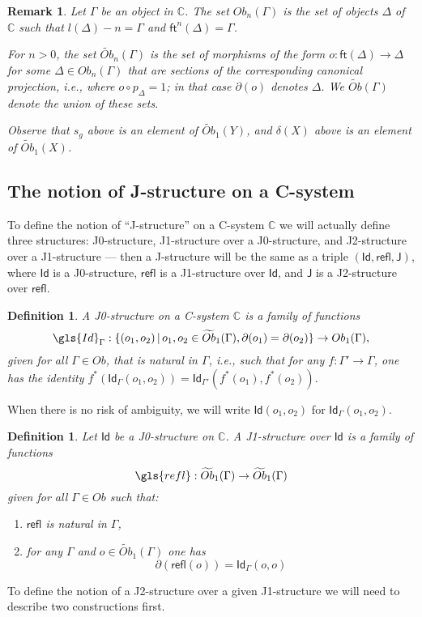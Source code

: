 \documentclass[12pt]{article}
\numberwithin{equation}{section}
\newenvironment{eq}{\begin{equation}}{\end{equation}}
\newtheorem{definition}[proposition]{Definition}
\newtheorem{remark}[proposition]{Remark}
\newcommand{\llabel}[1]{\label{#1}}
\newcommand{\sr}{\rightarrow}
\newcommand{\wt}{\widetilde}
\newcommand{\CC}{{\mathbb C}}  %
\newcommand{\id}{1}            %
\newcommand{\ft}{\mathsf{ft}}
\newcommand{\Id}{\mathsf{Id}} %
\newcommand{\refl}{\mathsf{refl}}
\newcommand{\J}{\mathsf{J}}
\newcommand{\Ob}{Ob}
\newcommand{\Obwt}{\wt{Ob}}
\begin{document}
\begin{remark}
  Let $\Gamma$ be an object in $\CC$.  The set $\Ob_n(\Gamma)$ is the set of
  objects $\Delta$ of $\CC$ such that $l(\Delta)-n = \Gamma$ and
  $\ft^n(\Delta) = \Gamma$.

  For $n>0$, the set $\Obwt_n(\Gamma)$ is the set of morphisms of the form $o :
  \ft(\Delta) \sr \Delta$ for some $\Delta \in \Ob_n(\Gamma)$ that are sections
  of the corresponding canonical projection, i.e., where $o \circ p_\Delta = \id$;
  in that case $\partial(o)$ denotes $\Delta$.  We $\Obwt(\Gamma)$ denote the
  union of these sets.

  Observe that $s_g$ above is an element of $\Obwt_1(Y)$, and $\delta(X)$ above
  is an element of $\Obwt_1(X)$.
\end{remark}

\subsection{The notion of J-structure on a C-system}
%


To define the notion of ``J-structure'' on a C-system $\CC$ we will actually define three
structures: J0-structure, J1-structure over a J0-structure, and J2-structure
over a J1-structure --- then a J-structure will be the same as a triple
$(\Id,\refl,\J)$, where $\Id$ is a J0-structure, $\refl$ is a J1-structure over
$\Id$, and $\J$ is a J2-structure over $\refl$.

\begin{definition}
\llabel{2015.03.27.def1}
A J0-structure on a C-system $\CC$ is a family of functions 
%
$$\gls{Id}_{\Gamma}:\{(o_1,o_2)\,|\,o_1, o_2 \in \Obwt_1(\Gamma), \partial(o_1)=\partial(o_2)\}\sr Ob_1(\Gamma),$$
%
given for all $\Gamma\in Ob$, that is natural in $\Gamma$, i.e., such that for any
$f:\Gamma'\sr \Gamma$, one has the identity
$f^*(\Id_{\Gamma}(o_1,o_2))=\Id_{\Gamma'}(f^*(o_1),f^*(o_2))$.
\end{definition}

When there is no risk of ambiguity, we will write $\Id(o_1,o_2)$ for $\Id_{\Gamma}(o_1,o_2)$.

\begin{definition}
\llabel{2015.03.27.def2}
Let $\Id$ be a J0-structure on $\CC$. A J1-structure over $\Id$ is a family of
functions
%
$$\gls{refl}:\Obwt_1(\Gamma)\sr \Obwt_1(\Gamma)$$
%
given for all $\Gamma\in Ob$ such that:
%
\begin{enumerate}
\item $\refl$ is natural in $\Gamma$,
\item for any $\Gamma$ and $o\in \Obwt_1(\Gamma)$ one has 
%
\begin{eq}
\llabel{2015.03.27.eq8}
\partial(\refl(o))=\Id_\Gamma(o,o)
\end{eq}%
\end{enumerate}
\end{definition}
%
To define the notion of a J2-structure over a given J1-structure we will need
to describe two constructions first.
\end{document}
